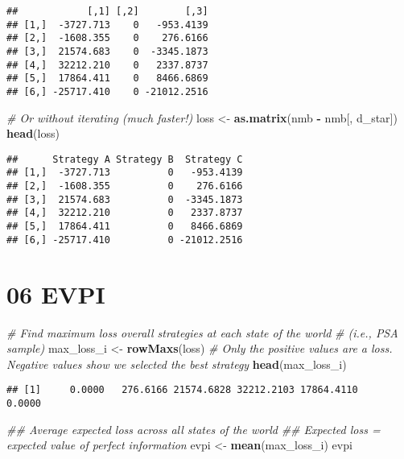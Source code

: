 \documentclass[
]{article}
\newenvironment{Shaded}{\begin{snugshade}}{\end{snugshade}}
\newcommand{\CommentTok}[1]{\textcolor[rgb]{0.56,0.35,0.01}{\textit{#1}}}
\newcommand{\KeywordTok}[1]{\textcolor[rgb]{0.13,0.29,0.53}{\textbf{#1}}}
\newcommand{\NormalTok}[1]{#1}
\newcommand{\OperatorTok}[1]{\textcolor[rgb]{0.81,0.36,0.00}{\textbf{#1}}}
\newcommand{\StringTok}[1]{\textcolor[rgb]{0.31,0.60,0.02}{#1}}
\begin{document}
\begin{verbatim}
##            [,1] [,2]        [,3]
## [1,]  -3727.713    0   -953.4139
## [2,]  -1608.355    0    276.6166
## [3,]  21574.683    0  -3345.1873
## [4,]  32212.210    0   2337.8737
## [5,]  17864.411    0   8466.6869
## [6,] -25717.410    0 -21012.2516
\end{verbatim}

\begin{Shaded}
\begin{Highlighting}[]
\CommentTok{# Or without iterating (much faster!)}
\NormalTok{loss <-}\StringTok{ }\KeywordTok{as.matrix}\NormalTok{(nmb }\OperatorTok{-}\StringTok{ }\NormalTok{nmb[, d_star])}
\KeywordTok{head}\NormalTok{(loss)}
\end{Highlighting}
\end{Shaded}

\begin{verbatim}
##      Strategy A Strategy B  Strategy C
## [1,]  -3727.713          0   -953.4139
## [2,]  -1608.355          0    276.6166
## [3,]  21574.683          0  -3345.1873
## [4,]  32212.210          0   2337.8737
## [5,]  17864.411          0   8466.6869
## [6,] -25717.410          0 -21012.2516
\end{verbatim}

\hypertarget{evpi}{%
\section{06 EVPI}\label{evpi}}

\begin{Shaded}
\begin{Highlighting}[]
\CommentTok{# Find maximum loss overall strategies at each state of the world }
\CommentTok{# (i.e., PSA sample)}
\NormalTok{max_loss_i <-}\StringTok{ }\KeywordTok{rowMaxs}\NormalTok{(loss)  }\CommentTok{# Only the positive values are a loss. Negative values show we selected the best strategy}
\KeywordTok{head}\NormalTok{(max_loss_i)}
\end{Highlighting}
\end{Shaded}

\begin{verbatim}
## [1]     0.0000   276.6166 21574.6828 32212.2103 17864.4110     0.0000
\end{verbatim}

\begin{Shaded}
\begin{Highlighting}[]
\CommentTok{## Average expected loss across all states of the world}
\CommentTok{## Expected loss = expected value of perfect information}
\NormalTok{evpi <-}\StringTok{ }\KeywordTok{mean}\NormalTok{(max_loss_i)}
\NormalTok{evpi}
\end{Highlighting}
\end{Shaded}
\end{document}
